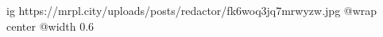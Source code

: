  
 
 
 
 

\ifcmt
  ig https://mrpl.city/uploads/posts/redactor/fk6woq3jq7mrwyzw.jpg
  @wrap center
  @width 0.6
\fi
